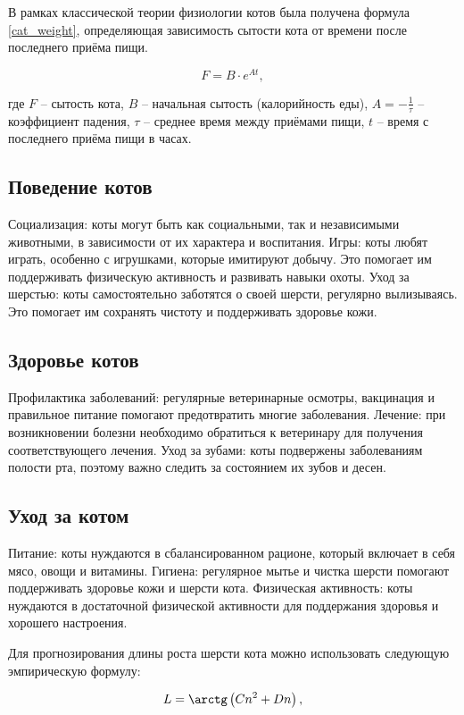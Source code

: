 \documentclass[12pt,a4paper]{article}
\begin{document}
        В рамках классической теории физиологии котов была получена формула \eqref{cat_weight}, определяющая зависимость сытости кота от времени после последнего приёма пищи.
        
\begin{equation}\label{cat_weight}
F = B \cdot e^{At},
\end{equation}

где $F$ -- сытость кота, $B$ -- начальная сытость (калорийность еды), $A = - \frac1\tau$ -- коэффициент падения, $\tau$ -- среднее время между приёмами пищи, $t$ -- время с последнего приёма пищи в часах.

\subsection{Поведение котов}
        Социализация: коты могут быть как социальными, так и независимыми животными, в зависимости от их характера и воспитания.
        Игры: коты любят играть, особенно с игрушками, которые имитируют добычу. Это помогает им поддерживать физическую активность и развивать навыки охоты.
        Уход за шерстью: коты самостоятельно заботятся о своей шерсти, регулярно вылизываясь. Это помогает им сохранять чистоту и поддерживать здоровье кожи.
\subsection{Здоровье котов}
        Профилактика заболеваний: регулярные ветеринарные осмотры, вакцинация и правильное питание помогают предотвратить многие заболевания.
        Лечение: при возникновении болезни необходимо обратиться к ветеринару для получения соответствующего лечения.
        Уход за зубами: коты подвержены заболеваниям полости рта, поэтому важно следить за состоянием их зубов и десен.
\subsection{Уход за котом}
        Питание: коты нуждаются в сбалансированном рационе, который включает в себя мясо, овощи и витамины.
        Гигиена: регулярное мытье и чистка шерсти помогают поддерживать здоровье кожи и шерсти кота.
        Физическая активность: коты нуждаются в достаточной физической активности для поддержания здоровья и хорошего настроения.

Для прогнозирования длины роста шерсти кота можно использовать следующую эмпирическую формулу:

\begin{equation}\label{cat_wool}
L = \arctg\left( Cn^2 + Dn \right),
\end{equation}
\end{document}
